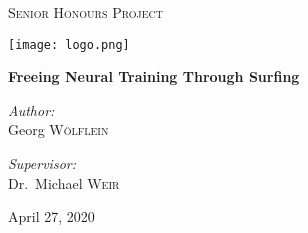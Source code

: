\begin{titlepage}
	\centering
	
	{\scshape\LARGE Senior Honours Project\par}
	\vspace{0.25cm}
	{\texttt{[image: logo.png]} \par}
	\vspace{0.25cm}
	{\huge\bfseries Freeing Neural Training Through Surfing\par}
	\vspace{0.5cm}

	\vfill

	\noindent
	\begin{minipage}{0.45\textwidth}
		\begin{center} \large
		  \textit{Author:}\\
          Georg \textsc{Wölflein}\\
		\end{center}
    \end{minipage}%
    \begin{minipage}{0.45\textwidth}
		\begin{center} \large
		\textit{Supervisor:} \\
		Dr.~Michael \textsc{Weir}
		\end{center}
	\end{minipage}%

	\vfill

	{April 27, 2020\par}
\end{titlepage}

